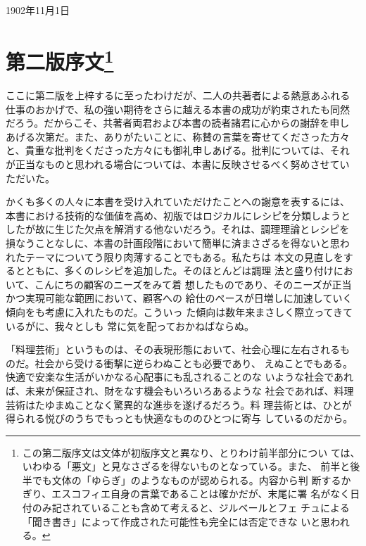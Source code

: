 1902年11月1日

\newpage

\hypertarget{introduction-deuxieme-edition}{%
\section[第二版序文]{\texorpdfstring{第二版序文\footnote{この第二版序文は文体が初版序文と異なり、とりわけ前半部分につい
  ては、いわゆる「悪文」と見なさざるを得ないものとなっている。また、
  前半と後半でも文体の「ゆらぎ」のようなものが認められる。内容から判
  断するかぎり、エスコフィエ自身の言葉であることは確かだが、末尾に署
  名がなく日付のみ記されていることも含めて考えると、ジルベールとフェ
  チュによる「聞き書き」によって作成された可能性も完全には否定できな
  いと思われる。}}{第二版序文}}\label{introduction-deuxieme-edition}}

\normalsize
{}
\vspace*{1\zw}

ここに第二版を上梓するに至ったわけだが、二人の共著者による熱意あふれる
仕事のおかげで、私の強い期待をさらに越える本書の成功が約束されたも同然
だろう。だからこそ、共著者両君および本書の読者諸君に心からの謝辞を申し
あげる次第だ。また、ありがたいことに、称賛の言葉を寄せてくださった方々
と、貴重な批判をくださった方々にも御礼申しあげる。批判については、それ
が正当なものと思われる場合については、本書に反映させるべく努めさせてい
ただいた。

かくも多くの人々に本書を受け入れていただけたことへの謝意を表するには、
本書における技術的な価値を高め、初版ではロジカルにレシピを分類しようと
したが故に生じた欠点を解消する他ないだろう。それは、調理理論とレシピを
損なうことなしに、本書の計画段階において簡単に済まさざるを得ないと思わ
れたテーマについてう限り肉薄することでもある。私たちは
本文の見直しをするとともに、多くのレシピを追加した。そのほとんどは調理
法と盛り付けにおいて、こんにちの顧客のニーズをみて着
想したものであり、そのニーズが正当かつ実現可能な範囲において、顧客への
給仕のペースが日増しに加速していく傾向をも考慮に入れたものだ。こういっ
た傾向は数年来まさしく際立ってきているがに、我々としも
常に気を配っておかねばならぬ。

「料理芸術」というものは、その表現形態において、社会心理に左右されるも
のだ。社会から受ける衝撃に逆らわぬことも必要であり、
えぬことでもある。快適で安楽な生活がいかなる心配事にも乱されることのな
いような社会であれば、未来が保証され、財をなす機会もいろいろあるような
社会であれば、料理芸術はたゆまぬことなく驚異的な進歩を遂げるだろう。料
理芸術とは、ひとが得られる悦びのうちでもっとも快適なもののひとつに寄与
しているのだから。

